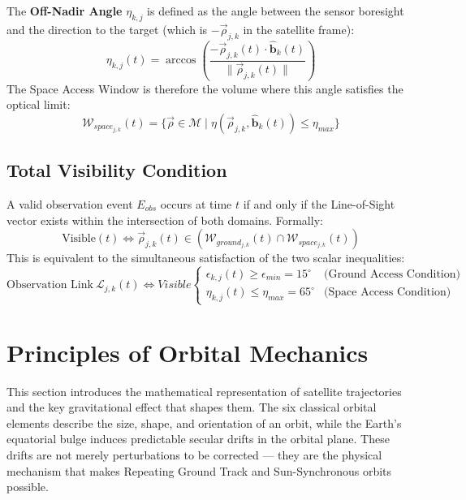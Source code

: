 The \textbf{Off-Nadir Angle} $\eta_{k,j}$ is defined as the angle between the sensor boresight and the direction to the target (which is $-\vec{\rho}_{j,k}$ in the satellite frame):
\begin{equation}
    \eta_{k,j}(t) = \arccos\left( \frac{-\vec{\rho}_{j,k}(t) \cdot \hat{\mathbf{b}}_{k}(t)}{\| \vec{\rho}_{j,k}(t) \|} \right)
\label{eq:eta}
\end{equation}
The Space Access Window is therefore the volume where this angle satisfies the optical limit:
\begin{equation}
    \mathcal{W}_{space_{j,k}}(t) = \{ \vec{\rho} \in \mathcal{M} \mid \eta(\vec{\rho}_{j,k}, \hat{\mathbf{b}}_k(t)) \leq \eta_{max} \}
\end{equation}
\subsection{Total Visibility Condition}
A valid observation event $E_{obs}$ occurs at time $t$ if and only if the Line-of-Sight vector exists within the intersection of both domains. Formally:
\begin{equation}
    \text{Visible}(t) \iff \vec{\rho}_{j,k}(t) \in \left( \mathcal{W}_{ground_{j,k}}(t) \cap \mathcal{W}_{space_{j,k}}(t) \right)
\end{equation}
This is equivalent to the simultaneous satisfaction of the two scalar inequalities:
\begin{equation}
    \text{Observation Link} \ \mathcal{L}_{j,k}(t) \iff Visible
    \begin{cases} 
        \epsilon_{k,j}(t) \geq \epsilon_{min} =15^{\circ} & \text{(Ground Access Condition)} \\
        \eta_{k,j}(t) \leq \eta_{max} = 65^{\circ} & \text{(Space Access Condition)}
    \end{cases}
    \label{eq:observation_link_condition}
\end{equation}


\section{Principles of Orbital
Mechanics}\label{71-principles-of-orbital-mechanics}

This section introduces the mathematical representation of satellite trajectories and the key gravitational effect that shapes them. The six classical orbital elements describe the size, shape, and orientation of an orbit, while the Earth's equatorial bulge induces predictable secular drifts in the orbital plane. These drifts are not merely perturbations to be corrected --- they are the physical mechanism that makes Repeating Ground Track and Sun-Synchronous orbits possible.

